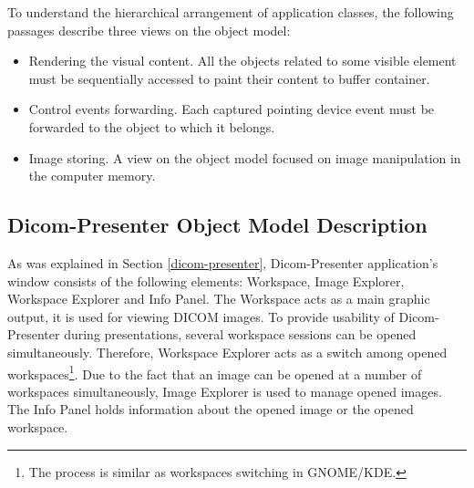 To understand the hierarchical arrangement of application classes, the following passages describe three views on the object model:

\begin{itemize}
\item Rendering the visual content. All the objects related to some visible element must be sequentially accessed to paint their content to buffer container.
\item Control events forwarding. Each captured pointing device event must be forwarded to the object to which it belongs.
\item Image storing. A view on the object model focused on image manipulation in the computer memory.
\end{itemize}

\subsection{Dicom-Presenter Object Model Description}
As was explained in Section \ref{dicom-presenter}, Dicom-Presenter application's window consists of the following elements:  Workspace, Image Explorer, Workspace Explorer and Info Panel. The Workspace acts as a main graphic output, it is used for viewing DICOM images. To provide usability of Dicom-Presenter during presentations, several workspace sessions can be opened simultaneously. Therefore, Workspace Explorer acts as a switch among opened workspaces\footnote{The process is similar as workspaces switching in GNOME/KDE.}. Due to the fact that an image can be opened at a number of workspaces simultaneously, Image Explorer is used to manage opened images. The Info Panel holds information about the opened image or the opened workspace.

